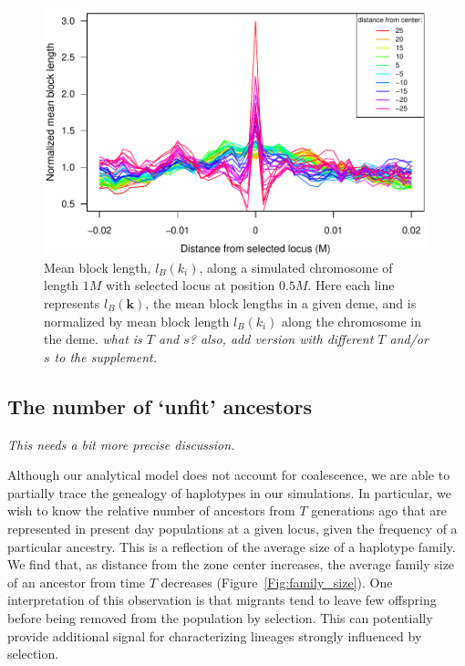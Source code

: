 \documentclass[11pt,letterpaper]{article}
\newcommand{\plr}[1]{{\em \color{blue} #1}}
\begin{document}
\begin{figure}
\includegraphics{figs/blocksAlongChromAncBConditioning}
\caption{Mean block length, $l_B(k_i)$, along a simulated chromosome of length $1M$ with selected locus at position $0.5M$. Here each line represents  $l_B(\mathbf{k})$, the mean block lengths in a given deme, and is normalized by mean block length $l_B(k_i)$ along the chromosome in the deme.
    \plr{what is $T$ and $s$? also, add version with different $T$ and/or $s$ to the supplement.}
}\label{Fig:blockLengths}
\end{figure}


\subsection*{The number of `unfit' ancestors}

\plr{This needs a bit more precise discussion.}

Although our analytical model does not account for coalescence, we are able to partially trace the genealogy of haplotypes in our simulations. In particular, we wish to know the relative number of ancestors from $T$ generations ago that are represented in present day populations at a given locus, given the frequency of a particular ancestry. This is a reflection of the average size of a haplotype family. We find that, as distance from the zone center increases, the average family size of an ancestor from time $T$ decreases (Figure~\ref{Fig:family_size}). One interpretation of this observation is that migrants tend to leave few offspring before being removed from the population by selection. This can potentially provide additional signal for characterizing lineages strongly influenced by selection.
\end{document}
